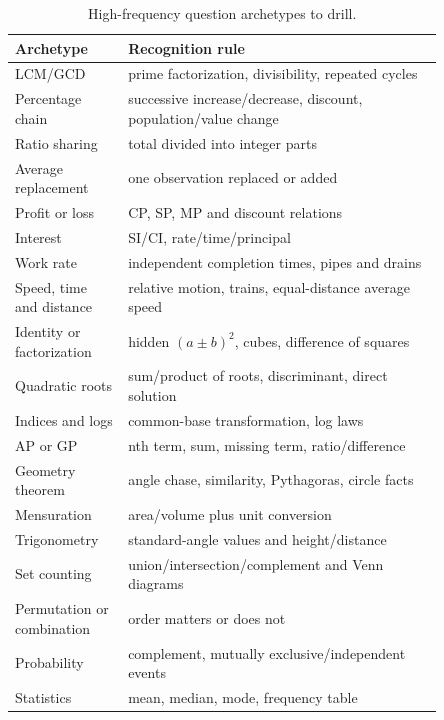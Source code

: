 \documentclass[12pt,a4paper,oneside]{book}
\begin{document}
\begin{table}[htbp]
\centering
\caption{High-frequency question archetypes to drill.}
\label{tab:archetypes}
\small
\begin{tabular}{@{}>{\raggedright\arraybackslash}p{0.22\linewidth}>{\raggedright\arraybackslash}p{0.63\linewidth}@{}}
\toprule
Archetype & Recognition rule \\
\midrule
LCM/GCD & prime factorization, divisibility, repeated cycles \\
Percentage chain & successive increase/decrease, discount, population/value change \\
Ratio sharing & total divided into integer parts \\
Average replacement & one observation replaced or added \\
Profit or loss & CP, SP, MP and discount relations \\
Interest & SI/CI, rate/time/principal \\
Work rate & independent completion times, pipes and drains \\
Speed, time and distance & relative motion, trains, equal-distance average speed \\
Identity or factorization & hidden \((a\pm b)^2\), cubes, difference of squares \\
Quadratic roots & sum/product of roots, discriminant, direct solution \\
Indices and logs & common-base transformation, log laws \\
AP or GP & nth term, sum, missing term, ratio/difference \\
Geometry theorem & angle chase, similarity, Pythagoras, circle facts \\
Mensuration & area/volume plus unit conversion \\
Trigonometry & standard-angle values and height/distance \\
Set counting & union/intersection/complement and Venn diagrams \\
Permutation or combination & order matters or does not \\
Probability & complement, mutually exclusive/independent events \\
Statistics & mean, median, mode, frequency table \\
\bottomrule
\end{tabular}
\end{table}
\end{document}
